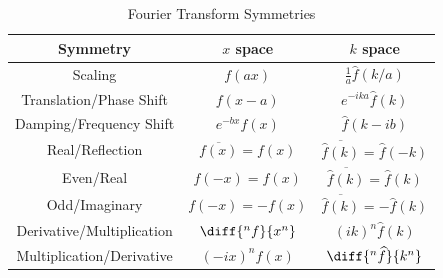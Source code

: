 \documentclass[10pt]{mypackage}
\begin{document}
\begin{table}
  \centering \renewcommand{\arraystretch}{1.5}
  \begin{tabular}{c|c|c}
    Symmetry & $x$ space & $k$ space\\
    \hline\hline
    Scaling & $\displaystyle f(ax)$ & $ \displaystyle \frac{1}{a}\widehat{f}\left(k/a\right)$\\
    Translation/Phase Shift & $\displaystyle f\left(x-a\right)$ & $\displaystyle e^{-ika}\widehat{f}\left(k\right)$\\
    Damping/Frequency Shift & $\displaystyle e^{-bx}f(x)$ & $\displaystyle \widehat{f}\left(k-ib\right)$\\
    Real/Reflection & $\displaystyle \overline{f(x)} = f\left(x\right)$ & $\overline{\widehat{f}\left(k\right)} = \widehat{f}\left(-k\right)$\\
    Even/Real & $f\left(-x\right) = f(x)$ & $\overline{\widehat{f}\left(k\right)} = \widehat{f}\left(k\right)$\\
    Odd/Imaginary & $f\left(-x\right) = -f\left(x\right)$ & $\overline{\widehat{f}\left(k\right)} = -\widehat{f}\left(k\right)$\\
    Derivative/Multiplication & $\diff{^n f}{x^n}$ & $\left(ik\right)^n \widehat{f}\left(k\right)$\\
    Multiplication/Derivative & $\left(-ix\right)^n f(x)$ & $\diff{^n\widehat{f}}{k^n}$
  \end{tabular}
  \caption{Fourier Transform Symmetries}
\end{table}
\end{document}
